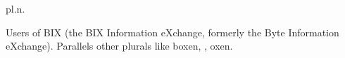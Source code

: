  pl.n.

Users of BIX (the BIX Information eXchange, formerly the Byte Information
eXchange). Parallels other plurals like boxen, , oxen.

